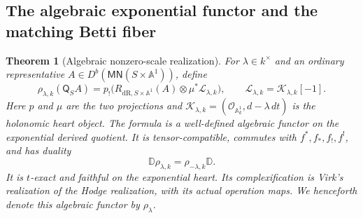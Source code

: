 \documentclass[11pt]{article}
\numberwithin{equation}{section}
\newtheorem{theorem}{Theorem}[section]
\theoremstyle{definition}
\theoremstyle{remark}
\newcommand{\A}{\mathbb A}
\newcommand{\Ocal}{\mathcal O}
\newcommand{\MN}{\mathsf{MN}}
\newcommand{\dR}{\mathrm{dR}}
\newcommand{\DD}{\mathbb D}
\begin{document}
\subsection{The algebraic exponential functor and the matching Betti fiber}

\begin{theorem}[Algebraic nonzero-scale realization]
\label{thm:algebraic-exponential}
For $\lambda\in k^\times$ and an ordinary representative
$A\in D^b(\MN(S\times\A^1))$, define
\begin{equation}\label{eq:algebraic-exponential-formula}
 \rho_{\lambda,k}(\mathsf Q_S A)
 =p_!\bigl(R_{\dR,S\times\A^1}(A)
             \otimes\mu^*\mathscr L_{\lambda,k}\bigr),
 \qquad \mathscr L_{\lambda,k}=\mathscr K_{\lambda,k}[-1].
\end{equation}
Here $p$ and $\mu$ are the two projections and
$\mathscr K_{\lambda,k}=(\Ocal_{\A^1_k},d-\lambda\,dt)$ is the
holonomic heart object. The formula is a well-defined algebraic functor
on the exponential derived quotient. It is tensor-compatible, commutes
with $f^*,f_*,f_!,f^!$, and has duality
\[
 \DD\rho_{\lambda,k}=\rho_{-\lambda,k}\DD.
\]
It is $t$-exact and faithful on the exponential heart. Its complexification
is Virk's realization of the Hodge realization, with its actual operation
maps. We henceforth denote this algebraic functor by $\rho_\lambda$.
\end{theorem}
\end{document}
